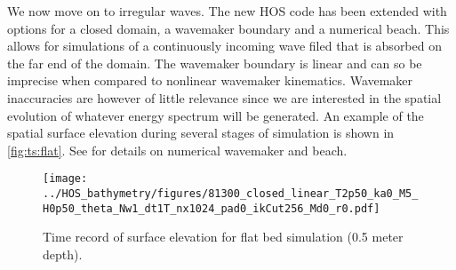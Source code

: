 
%
%
%
%



We now move on to irregular waves.
The new HOS code has been extended with options for a closed domain, a wavemaker boundary and a numerical beach. 
This allows for simulations of a continuously incoming wave filed that is absorbed on the far end of the domain. 
The wavemaker boundary is linear and can so be imprecise when compared to nonlinear wavemaker kinematics. 
Wavemaker inaccuracies are however of little relevance since we are interested in the spatial evolution of whatever energy spectrum will be generated. 
An example of the spatial surface elevation during several stages of simulation is shown in \autoref{fig:ts:flat}.
See \citet{SFo2018_HOS,bonnefoy2010,bonnefoy2006A_BM,ducrozet2006_BM} for details on numerical wavemaker and beach.
\\




\begin{figure}[H]%
\centering
\texttt{[image: ../HOS\_bathymetry/figures/81300\_closed\_linear\_T2p50\_ka0\_M5\_H0p50\_theta\_Nw1\_dt1T\_nx1024\_pad0\_ikCut256\_Md0\_r0.pdf]}%
\caption{Time record of surface elevation for flat bed simulation (0.5 meter depth).}%
\label{fig:ts:flat}%
\end{figure}


